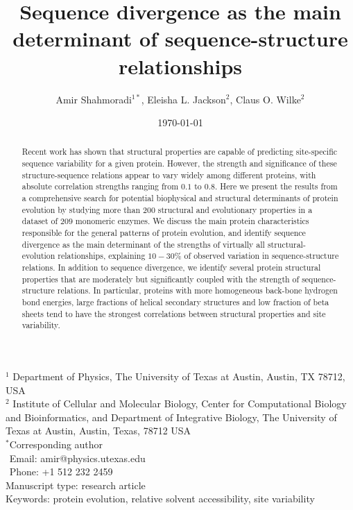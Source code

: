 \documentclass[12pt]{article}
\title{Sequence divergence as the main determinant of sequence-structure relationships}
\author{Amir Shahmoradi$^{1*}$, Eleisha L. Jackson$^2$, Claus O. Wilke$^2$}
\begin{document}
\date{\today}
\maketitle


\noindent
$^1$ Department of Physics, The University of Texas at Austin, Austin, TX 78712, USA \\
$^2$ Institute of Cellular and Molecular Biology, Center for Computational Biology and Bioinformatics, and Department of Integrative Biology, The University of Texas at Austin, Austin, Texas, 78712 USA\\

\bigskip
\noindent
$^*$Corresponding author\\
$\phantom{^*}$Email: amir@physics.utexas.edu\\
$\phantom{^*}$Phone: +1 512 232 2459\\

\bigskip
\noindent
Manuscript type: research article\\
\bigskip
\noindent  Keywords: protein evolution, relative solvent accessibility, site variability


\begin{abstract}
Recent work has shown that structural properties are capable of predicting site-specific sequence variability for a given protein. However, the strength and significance of these structure-sequence relations appear to vary widely among different proteins, with absolute correlation strengths ranging from $0.1$ to $0.8$. Here we present the results from a comprehensive search for potential biophysical and structural determinants of protein evolution by studying more than $200$ structural and evolutionary properties in a dataset of $209$ monomeric enzymes. We discuss the main protein characteristics responsible for the general patterns of protein evolution, and identify sequence divergence as the main determinant of the strengths of virtually all structural-evolution relationships, explaining $10-30 \%$ of observed variation in sequence-structure relations. In addition to sequence divergence, we identify several protein structural properties that are moderately but significantly coupled with the strength of sequence-structure relations. In particular, proteins with more homogeneous back-bone hydrogen bond energies, large fractions of helical secondary structures and low fraction of beta sheets tend to have the strongest correlations between structural properties and site variability. 
\end{abstract}
\vfill
\vfill
\def\thefootnote{\fnsymbol{footnote}}
\setcounter{footnote}{0}
\end{document}
